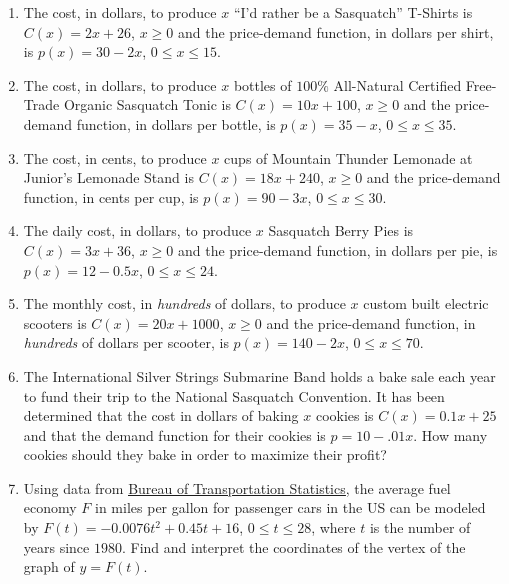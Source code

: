 \begin{enumerate}
\setcounter{enumi}{\value{HW}}

\item  The cost, in dollars, to produce $x$ ``I'd rather be a Sasquatch'' T-Shirts is $C(x) = 2x+26$, $x \geq 0$ and the price-demand function, in dollars per shirt,  is $p(x) = 30 - 2x$, $0 \leq x \leq 15$. \label{maxprofitfirst}

\item  The cost, in dollars, to produce $x$ bottles of $100 \%$ All-Natural Certified Free-Trade Organic Sasquatch Tonic is $C(x) = 10x+100$, $x \geq 0$ and the price-demand function, in dollars per bottle,  is $p(x) = 35 - x$, $0 \leq x \leq 35$.

\item  The cost, in cents, to produce $x$ cups of Mountain Thunder Lemonade at Junior's Lemonade Stand  is $C(x) = 18x + 240$, $x \geq 0$ and the price-demand function, in cents per cup,  is $p(x) = 90-3x$, $0 \leq x \leq 30$.

\item  The daily cost, in dollars, to produce $x$ Sasquatch Berry Pies is $C(x) = 3x + 36$, $x \geq 0$ and the price-demand function, in  dollars per pie,  is $p(x) = 12-0.5x$, $0 \leq x \leq 24$.

\item  The monthly cost, in \emph{hundreds} of dollars, to produce $x$ custom built electric scooters is $C(x) = 20x + 1000$, $x \geq 0$ and the price-demand function, in \emph{hundreds} of dollars per scooter,  is $p(x) = 140-2x$, $0 \leq x \leq 70$. \label{maxprofitlast}



\item The International Silver Strings Submarine Band holds a bake sale each year to fund their trip to the National Sasquatch Convention.  It has been determined that the cost in dollars of baking $x$ cookies is $C(x) = 0.1x + 25$ and that the demand function for their cookies is $p = 10 - .01x.$  How many cookies should they bake in order to maximize their profit?

\item Using data from \href{http://www.bts.gov/publications/national_transportation_statistics/html/table_04_23.html}{\underline{Bureau of Transportation Statistics}}, the average fuel economy $F$ in miles per gallon for passenger cars in the US can be modeled by  $F(t) = -0.0076t^2+0.45t + 16$, $0 \leq t \leq 28$, where $t$ is the number of years since $1980$. Find and interpret the coordinates of the vertex of the graph of $y = F(t)$.



\end{enumerate}
